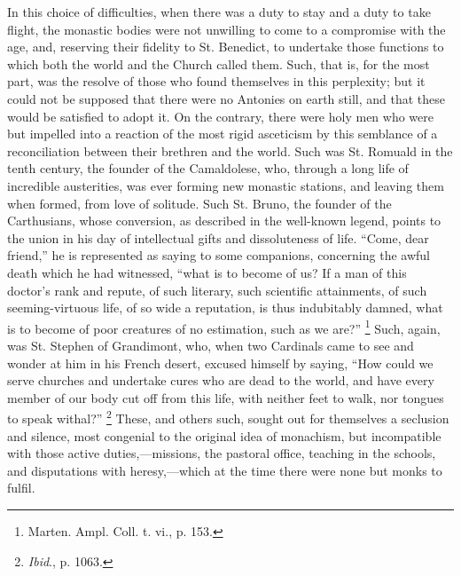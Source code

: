 In this choice of difficulties, when there was a duty to stay and a
duty to take flight, the monastic bodies were not unwilling to come to
a compromise with the age, and, reserving their fidelity to St.
Benedict, to undertake those functions to which both the world and the
Church called them. Such, that is, for the most part, was the resolve
of those who found themselves in this perplexity; but it could
not be supposed that there were no Antonies on earth still, and that
these would be satisfied to adopt it. On the contrary, there were holy
men who were but impelled into a reaction of the most rigid asceticism
by this semblance of a reconciliation between their brethren and the
world. Such was St. Romuald in the tenth century, the founder of the
Camaldolese, who, through a long life of incredible austerities, was
ever forming new monastic stations, and leaving them when formed, from
love of solitude. Such St. Bruno, the founder of the Carthusians,
whose conversion, as described in the well-known legend, points to the
union in his day of intellectual gifts and dissoluteness of life.
``Come, dear friend,'' he is represented as saying to some
companions, concerning the awful death which he had witnessed,
``what is to become of us? If a man of this doctor's rank and
repute, of such literary, such scientific attainments, of such
seeming-virtuous life, of so wide a reputation, is thus indubitably
damned, what is to become of poor creatures of no estimation, such as
we are?'' \footnote{Marten. Ampl.
Coll. t. vi., p. 153.} Such,
again, was St. Stephen of Grandimont, who, when two Cardinals came to
see and wonder at him in his French desert, excused himself by saying,
``How could we serve churches and undertake cures who are dead to
the world, and have every member of our body cut off from this life,
with neither feet to walk, nor tongues to speak withal?'' \footnote{\emph{Ibid}.,
p. 1063.} These, and others such, sought out for themselves a seclusion
and silence, most congenial to the original idea of monachism, but
incompatible with those active duties,—missions, the pastoral
office, teaching in the schools, and disputations with heresy,—which
at the time there were none but monks to fulfil.

